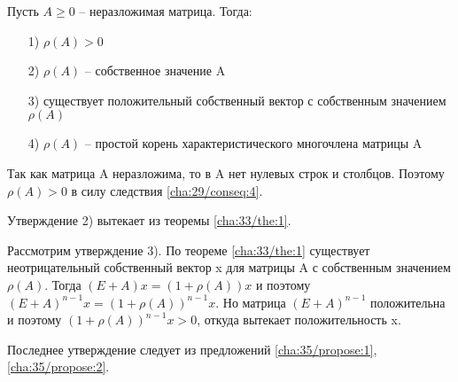 \begin{theorem}\label{cha:35/the:1}
	Пусть $A \ge 0$ – неразложимая матрица. Тогда:
	\begin{itemize}
		\item[1)] $\rho(A) > 0$
		\item[2)] $\rho(A)$ – собственное значение A
		\item[3)] существует положительный собственный вектор с собственным значением $\rho(A)$
		\item[4)] $\rho(A)$ – простой корень характеристического многочлена матрицы A
	\end{itemize}
\end{theorem}
\begin{Proof}
	Так как матрица A неразложима, то в A нет нулевых строк и столбцов. Поэтому $\rho(A) > 0$ в силу следствия \ref{cha:29/conseq:4}.

	Утверждение 2) вытекает из теоремы \ref{cha:33/the:1}.

	Рассмотрим утверждение 3). По теореме \ref{cha:33/the:1} существует неотрицательный собственный вектор x для матрицы A с собственным значением $\rho(A)$. Тогда $(E + A)x = (1 + \rho(A))x$ и поэтому $(E+A)^{n−1}x = (1+\rho(A))^{n−1}x$. Но матрица $(E+A)^{n−1}$ положительна и поэтому $(1 + \rho(A))^{n−1}x > 0$, откуда вытекает положительность x.

	Последнее утверждение следует из предложений \ref{cha:35/propose:1}, \ref{cha:35/propose:2}.
\end{Proof}


















